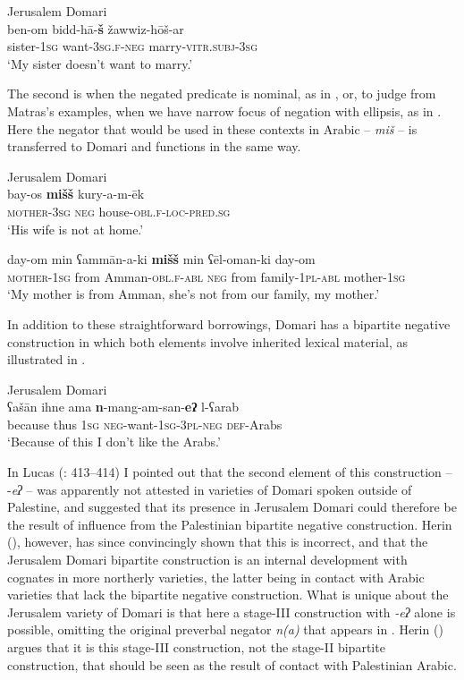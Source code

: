 \documentclass[output=paper]{langsci/langscibook}
\begin{document}
\ea\label{ex:key:dom}
{       Jerusalem Domari \citep[351]{Matras2012}}\\
\gll ben-om bidd-hā-\textbf{š} žawwiz-hōš-ar\\
     sister-\textsc{1sg} want\textsc{{}-3sg.f-neg} marry\textsc{-vitr.subj-3sg}\\
\glt ‘My sister doesn’t want to marry.’
\z

The second is when the negated predicate is nominal, as in , or, to judge from Matras’s examples, when we have narrow focus of negation with ellipsis, as in . Here the negator that would be used in these contexts in Arabic – \textit{miš} – is transferred to Domari and functions in the same way.

\ea
{Jerusalem Domari \citep[350]{Matras2012}}\\
\ea\gll bay-os \textbf{mišš} kury-a-m-ēk\label{ex:key:jer.a}\\
     \textsc{\textup{mother-}}\textsc{3sg} \textsc{neg} house\textsc{-obl.f-loc-pred.sg}  \\
\glt ‘His wife is not at home.’

\ex\gll day-om min ʕammān-a-ki \textbf{mišš} min ʕēl-oman-ki day-om\label{ex:key:jer.b}\\
     \textsc{\textup{mother-1}}\textsc{sg} from Amman-\textsc{obl.f-abl} \textsc{neg} from family-\textsc{1pl-abl} mother\textsc{-1sg}\\
\glt ‘My mother is from Amman, she’s not from our family, my mother.’
\z
\z

In addition to these straightforward borrowings, Domari has a bipartite negative construction in which both elements involve inherited lexical material, as illustrated in .

\ea\label{ex:key:jer.c}
{       Jerusalem Domari \citep[117]{Matras2012}}\\
\gll ʕašān ihne ama \textbf{n}-mang-am-san-\textbf{eʔ} l-ʕarab\\
     because thus \textsc{1sg} \textsc{neg-}want-\textsc{1sg-3pl-neg} \textsc{def-}Arabs\\
\glt ‘Because of this I don’t like the Arabs.’
\z

In Lucas (\citeyear{Lucas2013}: 413–414) I pointed out that the second element of this construction – -\textit{eʔ} – was apparently not attested in varieties of Domari spoken outside of Palestine, and suggested that its presence in Jerusalem Domari could therefore be the result of influence from the Palestinian bipartite negative construction. Herin (\citeyear{Herin2016,Herin2018}), however, has since convincingly shown that this is incorrect, and that the Jerusalem Domari bipartite construction is an internal development with cognates in more northerly varieties, the latter being in contact with Arabic varieties that lack the bipartite negative construction. What is unique about the Jerusalem variety of Domari is that here a stage-III construction with \textit{{}-eʔ} alone is possible, omitting the original preverbal negator \textit{n(a)} that appears in . Herin (\citeyear[32]{Herin2018}) argues that it is this stage-III construction, not the stage-II bipartite construction, that should be seen as the result of contact with Palestinian Arabic. 
\end{document}
